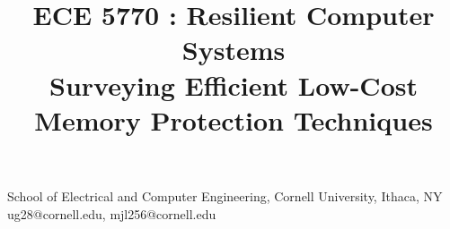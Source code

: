 \documentclass[10pt,nocopyrightspace]{sigplanconf}
\begin{document}
\renewcommand{\thesubfigure}{(\alph{subfigure})}
\title{ECE 5770 : Resilient Computer Systems \\
Surveying Efficient Low-Cost Memory Protection Techniques}

{School of Electrical and Computer Engineering, Cornell University, Ithaca, NY}
{ug28@cornell.edu, mjl256@cornell.edu}

\maketitle










\cite{surveyInt}




\end{document}
